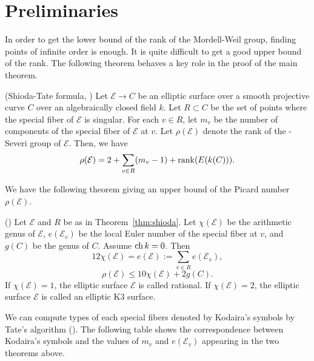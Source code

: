 \documentclass[main]{subfiles}
\begin{document}
\section{Preliminaries}

In order to get the lower bound of the rank of the Mordell-Weil group, finding points of infinite order is enough.
It is quite difficult to get a good upper bound of the rank.
The following theorem behaves a key role in the proof of the main theorem.
\begin{thm}{(Shioda-Tate formula, \cite[Corollary 5.3]{ref:shioda1990})}
    \label{thm:shioda}
    Let $\mathcal{E} \to C$ be an elliptic surface over a smooth projective curve $C$ over an algebraically closed field $k$.
    Let $R \subset C$ be the set of points where the special fiber of $\mathcal{E}$ is singular.
    For each $v \in R$, let $m_{v}$ be the number of components of the special fiber of $\mathcal{E}$ at $v$.
    Let $\rho(\mathcal{E})$ denote the rank of the \Neron-Severi group of $\mathcal{E}$.
    Then, we have
    \begin{equation*}
        \rho (\mathcal{E}) = 2 + \sum_{v \in R} (m_{v} - 1) + \operatorname{rank}(E(k(C))).
    \end{equation*}
\end{thm}

We have the following theorem giving an upper bound of the Picard number $\rho(\mathcal{E})$.

\begin{thm}{(\cite[Twierdzenie 2.2.9, 2.2.10, 2.2.19]{ref:naskreckiphd})}
    Let $\mathcal{E}$ and $R$ be as in Theorem~\ref{thm:shioda}.
    Let $\chi(\mathcal{E})$ be the arithmetic genus of $\mathcal{E}$, $e(\mathcal{E}_v)$ be the local Euler number of the special fiber at $v$, and $g(C)$ be the genus of $C$. \label{thm:rho}
    Assume $\operatorname{ch} k = 0$.
    Then
    \begin{equation*}
        12 \chi(\mathcal{E}) = e(\mathcal{E}) := \sum_{v \in R} e(\mathcal{E}_{v}),
    \end{equation*}
    \begin{equation*}
        \rho(\mathcal{E}) \leq 10 \chi(\mathcal{E}) + 2g(C).
    \end{equation*}
    If $\chi(\mathcal{E}) = 1$, the elliptic surface $\mathcal{E}$ is called rational.
    If $\chi(\mathcal{E}) = 2$, the elliptic surface $\mathcal{E}$ is called an elliptic K3 surface.
\end{thm}

We can compute types of each special fibers denoted by Kodaira's symbols by Tate's algorithm (\cite[IV \S 9]{ref:advancedaec}).
The following table shows the correspondence between Kodaira's symbols and the values of $m_v$ and $e(\mathcal{E}_v)$ appearing in the two theorems above.
\end{document}
